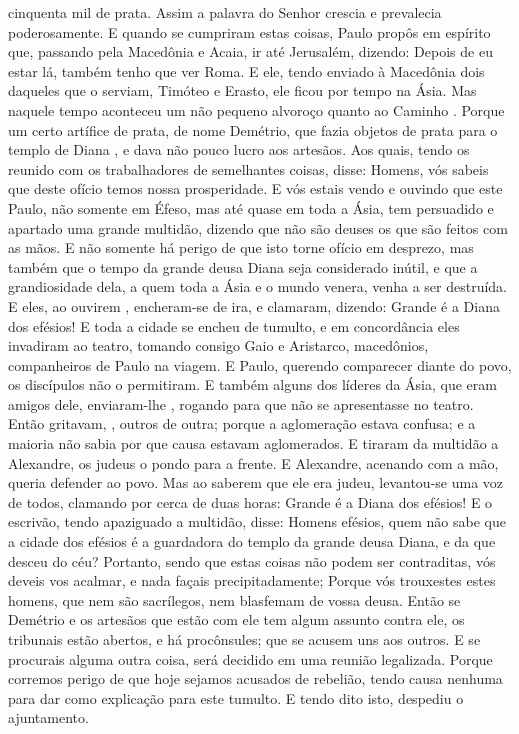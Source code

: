 {{} cinquenta mil
{} de prata.
  Assim a palavra do Senhor crescia e prevalecia poderosamente.
  E quando se cumpriram estas coisas, Paulo propôs em espírito que, passando pela Macedônia e Acaia, ir até Jerusalém, dizendo: Depois de eu estar lá, também tenho que ver Roma.
  E ele, tendo enviado à Macedônia dois daqueles que o serviam, Timóteo e Erasto, ele ficou por
{} tempo na Ásia.
  Mas naquele tempo aconteceu um não pequeno alvoroço quanto ao Caminho
 .
  Porque um certo artífice de prata, de nome Demétrio, que fazia objetos de prata para o templo de Diana
,  e dava não pouco lucro aos artesãos.
  Aos quais, tendo os reunido com os trabalhadores de semelhantes coisas, disse: Homens, vós sabeis que deste ofício temos nossa prosperidade.
  E vós estais vendo e ouvindo que este Paulo, não somente em Éfeso, mas até quase em toda a Ásia, tem persuadido e apartado uma grande multidão, dizendo que não são deuses os que são feitos com as mãos.
  E não somente há perigo de que isto torne
{} ofício em desprezo, mas também que
{} o tempo da grande deusa Diana seja considerado inútil, e que a grandiosidade dela, a quem toda a Ásia e o mundo venera, venha a ser destruída.
  E eles, ao ouvirem
{}, encheram-se de ira, e clamaram, dizendo: Grande é a Diana dos efésios!
  E toda a cidade se encheu de tumulto, e em concordância eles invadiram ao teatro, tomando consigo Gaio e Aristarco, macedônios, companheiros de Paulo na viagem.
  E Paulo, querendo comparecer diante do povo, os discípulos não o permitiram.
  E também alguns dos líderes da Ásia, que eram amigos dele, enviaram-lhe
{},  rogando{} para que não se apresentasse no teatro.
  Então gritavam,
{},  outros de outra; porque a aglomeração estava confusa; e a maioria não sabia por que causa estavam aglomerados.
  E tiraram da multidão a Alexandre, os judeus o pondo para a frente. E Alexandre, acenando com a mão, queria
{} defender ao povo.
  Mas ao saberem que ele era judeu, levantou-se uma voz de todos, clamando por cerca de duas horas: Grande é a Diana dos efésios!
  E o escrivão, tendo apaziguado a multidão, disse: Homens efésios, quem não sabe que a cidade dos efésios é a guardadora do templo da grande deusa Diana, e da
{} que desceu do céu?
  Portanto, sendo que estas coisas não podem ser contraditas, vós deveis vos acalmar, e nada façais precipitadamente;
  Porque vós trouxestes
{} estes homens, que nem são sacrílegos, nem blasfemam de vossa deusa.
  Então se Demétrio e os artesãos que estão com ele tem algum assunto contra ele, os tribunais estão abertos, e há procônsules; que se acusem uns aos outros.
  E se procurais alguma outra coisa, será decidido em uma reunião legalizada.
  Porque corremos perigo de que hoje sejamos acusados de rebelião, tendo causa nenhuma para dar como explicação para este tumulto.
  E tendo dito isto, despediu o ajuntamento.
\par }

